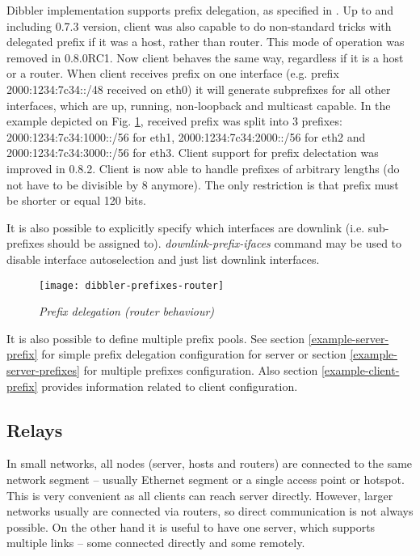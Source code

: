 Dibbler implementation supports prefix delegation, as specified in
\cite{rfc3633}. Up to and including 0.7.3 version, client was also
capable to do non-standard tricks with delegated prefix if it was a
host, rather than router. This mode of operation was removed in
0.8.0RC1. Now client behaves the same way, regardless if it is a host
or a router. When client receives prefix on one interface (e.g. prefix
2000:1234:7c34::/48 received on eth0) it will generate subprefixes for
all other interfaces, which are up, running, non-loopback and
multicast capable. In the example depicted on
Fig. \ref{fig-prefixes-router}, received prefix was split into 3
prefixes: 2000:1234:7c34:1000::/56 for eth1, 2000:1234:7c34:2000::/56
for eth2 and 2000:1234:7c34:3000::/56 for eth3. Client support for
prefix delectation was improved in 0.8.2. Client is now able to handle
prefixes of arbitrary lengths (do not have to be divisible by 8
anymore). The only restriction is that prefix must be shorter or equal
120 bits.

It is also possible to explicitly specify which interfaces are
downlink (i.e. sub-prefixes should be assigned
to). \emph{downlink-prefix-ifaces} command may be used to disable
interface autoselection and just list downlink interfaces.

\begin{figure}[ht]
\begin{center}
\label{fig-prefixes-router}
\texttt{[image: dibbler-prefixes-router]}
\caption{\emph{Prefix delegation (router behaviour)}}
\end{center}
\end{figure}

It is also possible to define multiple prefix pools. See section
\ref{example-server-prefix} for simple prefix delegation configuration
for server or section \ref{example-server-prefixes} for multiple
prefixes configuration. Also section \ref{example-client-prefix}
provides information related to client configuration.

\subsection{Relays}
\label{feature-relays}
In small networks, all nodes (server, hosts and routers) are connected
to the same network segment -- usually Ethernet segment or a single
access point or hotspot. This is very convenient as all clients can
reach server directly. However, larger networks usually are connected
via routers, so direct communication is not always possible. On the
other hand it is useful to have one server, which supports multiple
links -- some connected directly and some remotely.

